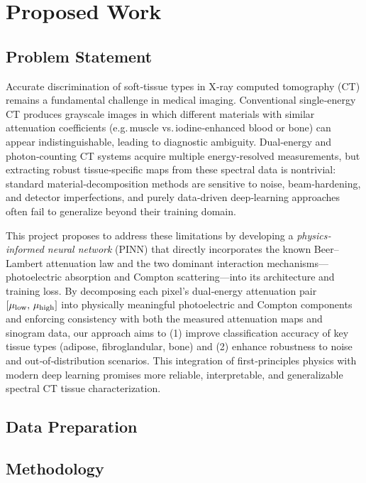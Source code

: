 \section{Proposed Work}\label{sec:proposed_work}

\subsection{Problem Statement}\label{subsec:problem_Statement}

Accurate discrimination of soft‐tissue types in X‐ray computed tomography (CT) remains a
fundamental challenge in medical imaging. Conventional single‐energy CT produces grayscale
images in which different materials with similar attenuation coefficients (e.g.\,muscle 
vs.\,iodine‐enhanced blood or bone) can appear indistinguishable, leading to diagnostic 
ambiguity. Dual‐energy and photon‐counting CT systems acquire multiple energy‐resolved 
measurements, but extracting robust tissue‐specific maps from these spectral data is 
nontrivial: standard material‐decomposition methods are sensitive to noise, beam‐hardening, 
and detector imperfections, and purely data‐driven deep‐learning approaches often fail to 
generalize beyond their training domain.

This project proposes to address these limitations by developing a \emph{physics‐informed neural network} 
(PINN) that directly incorporates the known Beer–Lambert attenuation law and the two dominant 
interaction mechanisms—photoelectric absorption and Compton scattering—into its architecture 
and training loss. By decomposing each pixel’s dual‐energy attenuation pair \([\mu_{\rm low},\,
\mu_{\rm high}]\) into physically meaningful photoelectric and Compton components and enforcing 
consistency with both the measured attenuation maps and sinogram data, our approach aims to (1)
improve classification accuracy of key tissue types (adipose, fibroglandular, bone) and (2) 
enhance robustness to noise and out‐of‐distribution scenarios. This integration of first‐principles 
physics with modern deep learning promises more reliable, interpretable, and generalizable 
spectral CT tissue characterization.

\subsection{Data Preparation}\label{sec:data_preparation}

\subsection{Methodology}\label{subsec:price_prediction_methodology}


